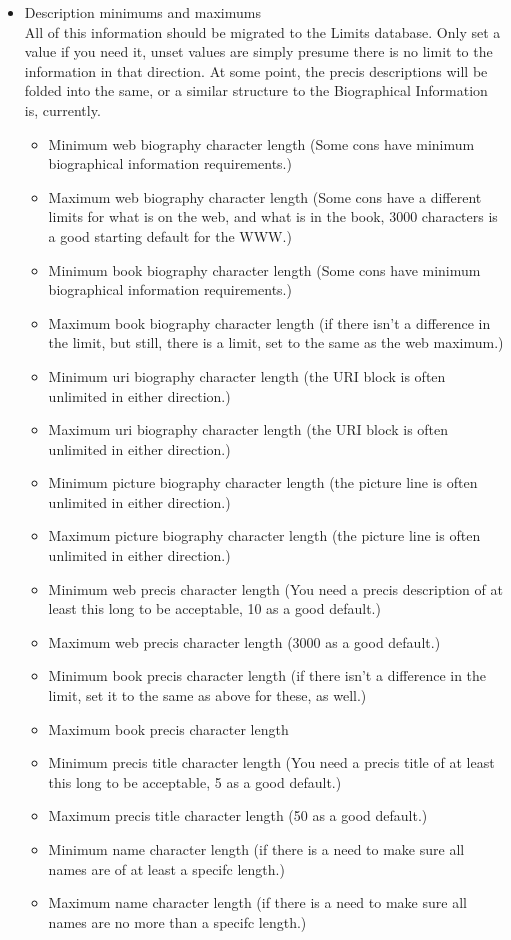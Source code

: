 \documentclass[tablesignature]{scrartcl}
\begin{document}
\begin{itemize}
\item Description minimums and maximums\\
\label{sec-1_2_4_4}%
All of this information should be migrated to the Limits
     database.  Only set a value if you need it, unset values are
     simply presume there is no limit to the information in that
     direction.  At some point, the precis descriptions will be folded
     into the same, or a similar structure to the Biographical
     Information is, currently.
\begin{itemize}
\item Minimum web biography character length (Some cons have minimum
       biographical information requirements.)
\item Maximum web biography character length (Some cons have a
       different limits for what is on the web, and what is in the
       book, 3000 characters is a good starting default for the WWW.)
\item Minimum book biography character length (Some cons have minimum
       biographical information requirements.)
\item Maximum book biography character length (if there isn't a
       difference in the limit, but still, there is a limit, set to
       the same as the web maximum.)
\item Minimum uri biography character length (the URI block is often
       unlimited in either direction.)
\item Maximum uri biography character length (the URI block is often
       unlimited in either direction.)
\item Minimum picture biography character length (the picture line is
       often unlimited in either direction.)
\item Maximum picture biography character length (the picture line is
       often unlimited in either direction.)
\item Minimum web precis character length (You need a precis
       description of at least this long to be acceptable, 10 as a
       good default.)
\item Maximum web precis character length (3000 as a good default.)
\item Minimum book precis character length (if there isn't a
       difference in the limit, set it to the same as above for these,
       as well.)
\item Maximum book precis character length
\item Minimum precis title character length (You need a precis title
       of at least this long to be acceptable, 5 as a good default.)
\item Maximum precis title character length (50 as a good default.)
\item Minimum name character length (if there is a need to make sure
       all names are of at least a specifc length.)
\item Maximum name character length (if there is a need to make sure
       all names are no more than a specifc length.)
\end{itemize}



\end{itemize}
\end{document}
